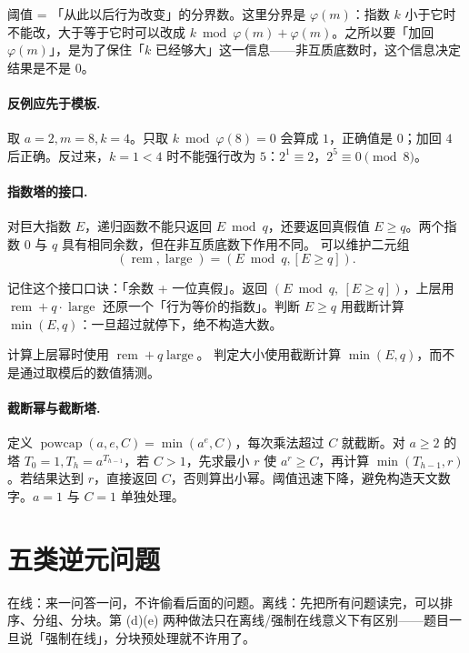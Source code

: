 \documentclass[UTF8,a4paper,11pt,twoside,openright,fontset=fandol]{ctexbook}
\theoremstyle{definition}
\newcommand{\iva}[1]{\left[#1\right]}
\begin{document}
\begin{tip}[阈值这个词]
阈值 = 「从此以后行为改变」的分界数。这里分界是 $\varphi(m)$：指数 $k$ 小于它时不能改，大于等于它时可以改成 $k\bmod\varphi(m)+\varphi(m)$。之所以要「加回 $\varphi(m)$」，是为了保住「$k$ 已经够大」这一信息——非互质底数时，这个信息决定结果是不是 $0$。
\end{tip}


\paragraph{反例应先于模板.} 取 $a=2,m=8,k=4$。只取 $k\bmod\varphi(8)=0$ 会算成 $1$，正确值是 $0$；加回 $4$ 后正确。反过来，$k=1<4$ 时不能强行改为 $5$：$2^1\equiv2$，$2^5\equiv0\pmod8$。

\paragraph{指数塔的接口.} 对巨大指数 $E$，递归函数不能只返回 $E\bmod q$，还要返回真假值 $E\ge q$。两个指数 $0$ 与 $q$ 具有相同余数，但在非互质底数下作用不同。
可以维护二元组
\[
 (\operatorname{rem},\operatorname{large})=(E\bmod q,\iva{E\ge q}).
\]

\begin{tip}
记住这个接口口诀：「余数 + 一位真假」。返回 $(E\bmod q,\ \iva{E\ge q})$，上层用 $\operatorname{rem}+q\cdot\operatorname{large}$ 还原一个「行为等价的指数」。判断 $E\ge q$ 用截断计算 $\min(E,q)$：一旦超过就停下，绝不构造大数。
\end{tip}

计算上层幂时使用 $\operatorname{rem}+q\operatorname{large}$。
判定大小使用截断计算 $\min(E,q)$，而不是通过取模后的数值猜测。

\paragraph{截断幂与截断塔.} 定义 $\operatorname{powcap}(a,e,C)=\min(a^e,C)$，每次乘法超过 $C$ 就截断。对 $a\ge2$ 的塔 $T_0=1,T_h=a^{T_{h-1}}$，若 $C>1$，先求最小 $r$ 使 $a^r\ge C$，再计算 $\min(T_{h-1},r)$。若结果达到 $r$，直接返回 $C$，否则算出小幂。阈值迅速下降，避免构造天文数字。$a=1$ 与 $C=1$ 单独处理。


\section{五类逆元问题}
\begin{tip}[在线/离线]
在线：来一问答一问，不许偷看后面的问题。离线：先把所有问题读完，可以排序、分组、分块。第 (d)(e) 两种做法只在离线/强制在线意义下有区别——题目一旦说「强制在线」，分块预处理就不许用了。
\end{tip}
\end{document}
